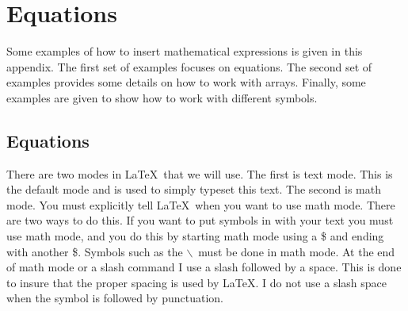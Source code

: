 \chapter{Equations}

Some examples of how to insert mathematical expressions is given in
this appendix. The first set of examples focuses on equations. The
second set of examples provides some details on how to work with
arrays. Finally, some examples are given to show how to work with
different symbols.


\section{Equations}
There are two modes in \LaTeX\ that we will use.  The first is text
mode.  This is the default mode and is used to simply typeset this
text.  The second is math mode.  You must explicitly tell \LaTeX\ when
you want to use math mode.  There are two ways to do this.  If you
want to put symbols in with your text you must use math mode, and you
do this by starting math mode using a \$ and ending with another \$.
Symbols such as the $\backslash$\ must be done in math mode.  At the
end of math mode or a slash command I use a slash followed by a space.
This is done to insure that the proper spacing is used by \LaTeX.  I
do not use a slash space when the symbol is followed by punctuation.



